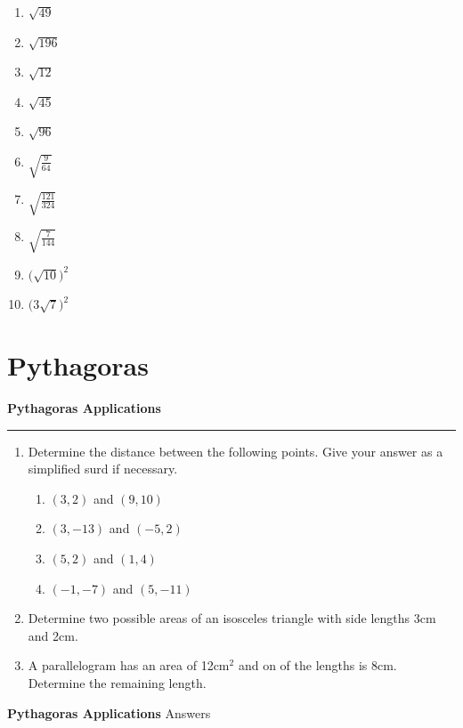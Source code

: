 \documentclass[12pt]{article}
\begin{document}
\begin{enumerate}
    \item \(\sqrt{49}\)
    \item \(\sqrt{196}\)
    \item \(\sqrt{12}\)
    \item \(\sqrt{45}\)
    \item \(\sqrt{96}\)
    \item \(\sqrt{\frac{9}{64}}\)
    \item \(\sqrt{\frac{121}{324}}\)
    \item \(\sqrt{\frac{7}{144}}\)
    \item \(\big(\sqrt{10}\big)^2\)
    \item \(\big(3\sqrt{7}\big)^2\)
\end{enumerate}

\newpage

\section{Pythagoras}

\newpage

\noindent \textbf{Pythagoras Applications}

\medskip

\hrule 

\medskip

\begin{enumerate}
    \item Determine the distance between the following points. Give your answer as a simplified surd if necessary.
    \begin{enumerate}
        \item \((3,2)\) and \( (9, 10) \)
        \item \( (3,-13)\) and \( (-5, 2) \)
        \item \((5,2)\) and \((1,4)\)
        \item \((-1,-7)\) and \((5,-11)\)
    \end{enumerate}
    \item Determine two possible areas of an isosceles triangle with side lengths 3cm and 2cm.
    \item A parallelogram has an area of 12cm\(^2\) and on of the lengths is 8cm. Determine the remaining length.
\end{enumerate}

\newpage

\noindent \textbf{Pythagoras Applications} \hfill Answers
\end{document}
